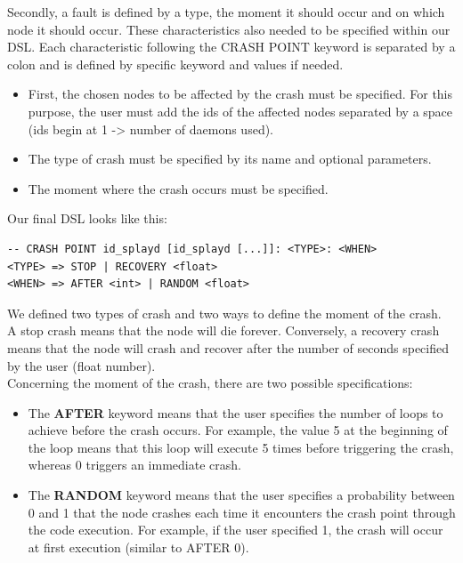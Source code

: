 \documentclass{eplmastersthesis}
\begin{document}
        Secondly, a fault is defined by a type, the moment it should occur and
        on which node it should occur. These characteristics also needed to
        be specified within our DSL. Each characteristic following the
        \textsc{CRASH POINT} keyword is separated by a colon and is defined
        by specific keyword and values if needed.

        \begin{itemize}
          \item First, the chosen nodes to be affected by the crash must be
          specified. For this purpose, the user must add the ids of the
          affected nodes separated by a space (ids begin at 1 -> number of
          daemons used).
          \item The type of crash must be specified by its name and optional
          parameters.
          \item The moment where the crash occurs must be specified.
        \end{itemize}

        Our final DSL looks like this:

        \begin{lstlisting}[style=MyBigBash]
-- CRASH POINT id_splayd [id_splayd [...]]: <TYPE>: <WHEN>
<TYPE> => STOP | RECOVERY <float>
<WHEN> => AFTER <int> | RANDOM <float>
        \end{lstlisting}

        We defined two types of crash and two ways to
        define the moment of the crash.\\
        A stop crash means that the node will die forever. Conversely, a
        recovery crash means that the node will crash and recover after the
        number of seconds specified by the user (float number).\\
        Concerning the moment of the crash, there are two possible specifications:

        \begin{itemize}
          \item The \textbf{\textsc{AFTER}} keyword means that the user specifies the
          number of loops to achieve before the crash occurs. For example,
          the value 5 at the beginning of the loop means that this loop will
          execute 5 times before triggering the crash, whereas 0 triggers
          an immediate crash.
          \item The \textbf{\textsc{RANDOM}} keyword means that the user specifies a
          probability between 0 and 1 that the node crashes each time it
          encounters the crash point through the code execution. For example,
          if the user specified 1, the crash will occur at first execution
          (similar to \textsc{AFTER} 0).
        \end{itemize}
\end{document}
